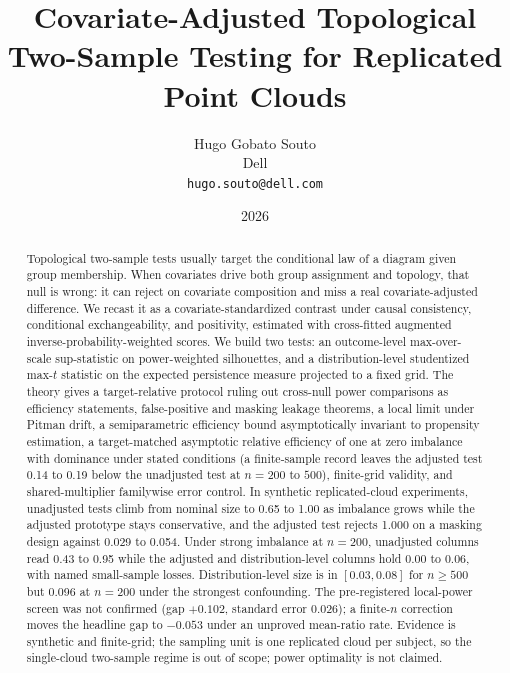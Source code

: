 \documentclass[11pt,a4paper]{article}
\title{Covariate-Adjusted Topological Two-Sample Testing for Replicated Point Clouds}
\author{Hugo Gobato Souto\\ Dell\\ \texttt{hugo.souto@dell.com}}
\date{2026}
\begin{document}
\maketitle

\begin{abstract}
Topological two-sample tests usually target the conditional law of a diagram given group membership. When covariates drive both group assignment and topology, that null is wrong: it can reject on covariate composition and miss a real covariate-adjusted difference. We recast it as a covariate-standardized contrast under causal consistency, conditional exchangeability, and positivity, estimated with cross-fitted augmented inverse-probability-weighted scores. We build two tests: an outcome-level max-over-scale sup-statistic on power-weighted silhouettes, and a distribution-level studentized max-$t$ statistic on the expected persistence measure projected to a fixed grid. The theory gives a target-relative protocol ruling out cross-null power comparisons as efficiency statements, false-positive and masking leakage theorems, a local limit under Pitman drift, a semiparametric efficiency bound asymptotically invariant to propensity estimation, a target-matched asymptotic relative efficiency of one at zero imbalance with dominance under stated conditions (a finite-sample record leaves the adjusted test 0.14 to 0.19 below the unadjusted test at $n=200$ to $500$), finite-grid validity, and shared-multiplier familywise error control. In synthetic replicated-cloud experiments, unadjusted tests climb from nominal size to 0.65 to 1.00 as imbalance grows while the adjusted prototype stays conservative, and the adjusted test rejects 1.000 on a masking design against 0.029 to 0.054. Under strong imbalance at $n=200$, unadjusted columns read 0.43 to 0.95 while the adjusted and distribution-level columns hold 0.00 to 0.06, with named small-sample losses. Distribution-level size is in $[0.03,0.08]$ for $n \ge 500$ but 0.096 at $n=200$ under the strongest confounding. The pre-registered local-power screen was not confirmed (gap $+0.102$, standard error $0.026$); a finite-$n$ correction moves the headline gap to $-0.053$ under an unproved mean-ratio rate. Evidence is synthetic and finite-grid; the sampling unit is one replicated cloud per subject, so the single-cloud two-sample regime is out of scope; power optimality is not claimed.
\end{abstract}








\appendix



{\sloppy

}
\end{document}
